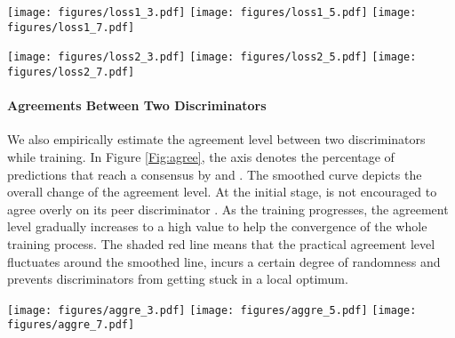 \begin{figure*}[!htb]
\vspace{-0.15in}
    \centering
{\texttt{[image: figures/loss1\_3.pdf]}
    }
{\texttt{[image: figures/loss1\_5.pdf]} 
    }
    {\texttt{[image: figures/loss1\_7.pdf]}
    }
        \vspace{-5pt}
        \caption{The loss of  in \PG{} with  on STL-10 dataset, left: ; middle: ; right: .}
    \label{Fig:loss1}
\end{figure*}

\begin{figure*}[!htb]
\vspace{-0.15in}
\centering
{\texttt{[image: figures/loss2\_3.pdf]}
    }
{\texttt{[image: figures/loss2\_5.pdf]} 
    }
    {\texttt{[image: figures/loss2\_7.pdf]}
    }
        \vspace{-5pt}
        \caption{The loss of  in \PG{} with  on STL-10 dataset, left: ; middle: ; right: .}
    \label{Fig:loss2}
\end{figure*}

\paragraph{\textbf{Agreements Between Two Discriminators}}
We also empirically estimate the agreement level between two discriminators while training. In Figure \ref{Fig:agree}, the axis denotes the percentage of predictions that reach a consensus by  and . The smoothed curve depicts the overall change of the agreement level. At the initial stage,  is not encouraged to agree overly on its peer discriminator . As the training progresses, the agreement level gradually increases to a high value to help the convergence of the whole training process. The shaded red line means that the practical agreement level fluctuates around the smoothed line, incurs a certain degree of randomness and prevents discriminators from getting stuck in a local optimum.

\begin{figure*}[!htb]
\vspace{-0.15in}
    \centering
    {\texttt{[image: figures/aggre\_3.pdf]}
    } 
    {\texttt{[image: figures/aggre\_5.pdf]} 
    }
    {\texttt{[image: figures/aggre\_7.pdf]}
    }
        \vspace{-5pt}
        \caption{The agreement level between  and  in \PG{} with  on STL-10 dataset, left: ; middle: ; right: .}
    \label{Fig:agree}
\end{figure*}

